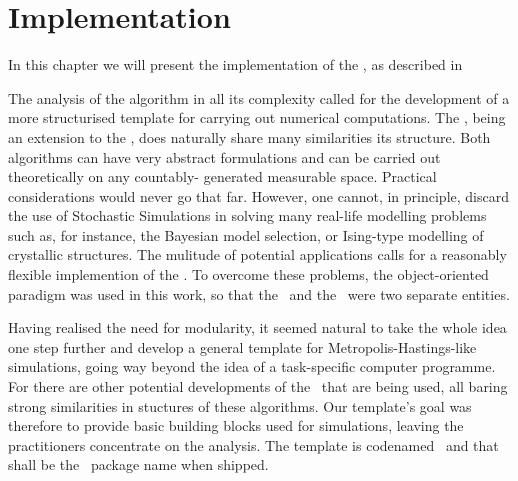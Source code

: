 \chapter{ Implementation }\label{Implementation}

In this chapter we will present the implementation of the \PTalgo, as described in 

The analysis of the algorithm in all its complexity called for the development
of a more structurised template for carrying out numerical computations. The
\PTalgo, being an extension to the \MHalgo, does naturally share many similarities its structure. Both algorithms can have very
abstract formulations and can be carried out theoretically on any countably-
generated measurable space. Practical considerations would never go that far.
However, one cannot, in principle, discard the use of Stochastic Simulations in solving many real-life modelling problems such as, for instance, the Bayesian model selection, or Ising-type modelling of crystallic structures. The mulitude of potential applications calls for a reasonably flexible implemention of the \PTalgo. To overcome these problems, the object-oriented paradigm was used in this work, so that the \sspace\, and the \algo\, were two separate entities. 

Having realised the need for modularity, it seemed natural to take the whole idea one step further and develop a general template for Metropolis-Hastings-like simulations, going way beyond the idea of a task-specific computer programme. For there are other potential developments of the \MHalgo\, that are being used, all baring strong similarities in stuctures of these algorithms. Our template's goal was therefore to provide basic building blocks used for simulations, leaving the practitioners concentrate on the analysis. The template is codenamed \ssimul \, and that shall be the \RR\, package name when shipped.


